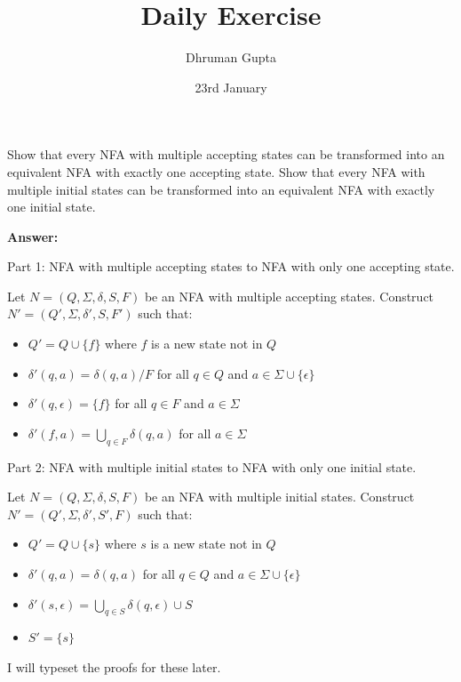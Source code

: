 \documentclass[11pt]{article}
\title{Daily Exercise}
\author{Dhruman Gupta}
\date{23rd January}
\begin{document}

Show that every NFA with multiple accepting states can be transformed into an equivalent NFA with exactly one accepting state. Show that every NFA with multiple initial states can be transformed into an equivalent NFA with exactly one initial state.

\noindent
\textbf{Answer:}

Part 1: NFA with multiple accepting states to NFA with only one accepting state.

Let $N = (Q, \Sigma, \delta, S, F)$ be an NFA with multiple accepting states. Construct $N' = (Q', \Sigma, \delta', S, F')$ such that:
\begin{itemize}
    \item $Q' = Q \cup \{f\}$ where $f$ is a new state not in $Q$
    \item $\delta'(q, a) = \delta(q, a) / F$ for all $q \in Q$ and $a \in \Sigma \cup \{\epsilon\}$
    \item $\delta'(q, \epsilon) = \{f\}$ for all $q \in F$ and $a \in \Sigma$
    \item $\delta'(f, a) = \bigcup_{q \in F} \delta(q, a)$ for all $a \in \Sigma$
\end{itemize}

Part 2: NFA with multiple initial states to NFA with only one initial state.

Let $N = (Q, \Sigma, \delta, S, F)$ be an NFA with multiple initial states. Construct $N' = (Q', \Sigma, \delta', S', F)$ such that:
\begin{itemize}
    \item $Q' = Q \cup \{s\}$ where $s$ is a new state not in $Q$
    \item $\delta'(q, a) = \delta(q, a)$ for all $q \in Q$ and $a \in \Sigma \cup \{\epsilon\}$
    \item $\delta'(s, \epsilon) = \bigcup_{q \in S} \delta(q, \epsilon) \cup S$
    \item $S' = \{s\}$
\end{itemize}

I will typeset the proofs for these later.
\end{document}
